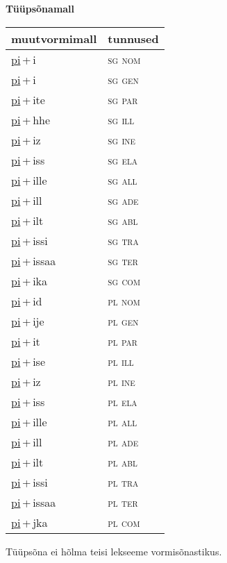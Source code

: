 
\vspace{1.8em}
\begin{minipage}{\textwidth}
\textbf{Tüüpsõnamall \,}\\

\begin{sideways}
\begin{tabular}{l l}
muutvormimall & tunnused \\
\hline
\underline{pi}\,+\,i & \textsc{ sg nom } \\
\underline{pi}\,+\,i & \textsc{ sg gen } \\
\underline{pi}\,+\,ite & \textsc{ sg par } \\
\underline{pi}\,+\,hhe & \textsc{ sg ill } \\
\underline{pi}\,+\,iz & \textsc{ sg ine } \\
\underline{pi}\,+\,iss & \textsc{ sg ela } \\
\underline{pi}\,+\,ille & \textsc{ sg all } \\
\underline{pi}\,+\,ill & \textsc{ sg ade } \\
\underline{pi}\,+\,ilt & \textsc{ sg abl } \\
\underline{pi}\,+\,issi & \textsc{ sg tra } \\
\underline{pi}\,+\,issaa & \textsc{ sg ter } \\
\underline{pi}\,+\,ika & \textsc{ sg com } \\
\underline{pi}\,+\,id & \textsc{ pl nom } \\
\underline{pi}\,+\,ije & \textsc{ pl gen } \\
\underline{pi}\,+\,it & \textsc{ pl par } \\
\underline{pi}\,+\,ise & \textsc{ pl ill } \\
\underline{pi}\,+\,iz & \textsc{ pl ine } \\
\underline{pi}\,+\,iss & \textsc{ pl ela } \\
\underline{pi}\,+\,ille & \textsc{ pl all } \\
\underline{pi}\,+\,ill & \textsc{ pl ade } \\
\underline{pi}\,+\,ilt & \textsc{ pl abl } \\
\underline{pi}\,+\,issi & \textsc{ pl tra } \\
\underline{pi}\,+\,issaa & \textsc{ pl ter } \\
\underline{pi}\,+\,jka & \textsc{ pl com } \\
\end{tabular}
\end{sideways}
\label{tab:tüüpsõnamall-pii}

\end{minipage}

 
\vspace{1em}
\noindent Tüüpsõna ei hõlma teisi lekseeme vormi\-sõnastikus.
